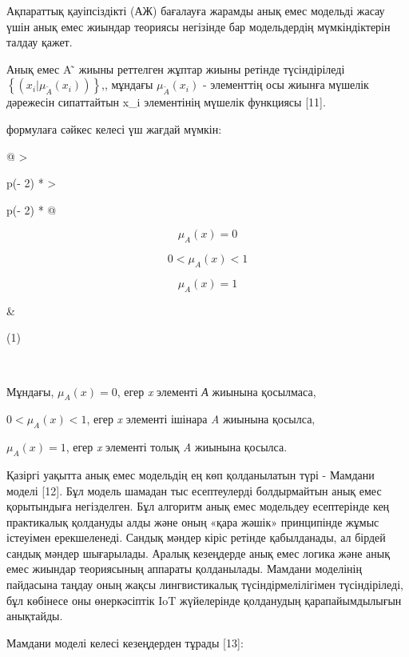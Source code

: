 \documentclass[
]{article}
\begin{document}
Ақпараттық қауіпсіздікті (АЖ) бағалауға жарамды анық емес модельді жасау
үшін анық емес жиындар теориясы негізінде бар модельдердің
мүмкіндіктерін талдау қажет.

Анық емес A ̃ жиыны реттелген жұптар жиыны ретінде түсіндіріледі
\(\left\{ \left( x_{i}|\mu_{\widetilde{A}}(x_{i}) \right) \right\}\),,
мұндағы \(\mu_{\widetilde{A}}(x_{i})\) - элементтің осы жиынға мүшелік
дәрежесін сипаттайтын x\_i элементінің мүшелік функциясы {[}11{]}.

формулаға сәйкес келесі үш жағдай мүмкін:

\begin{longtable}[]{@{}
  >{\raggedright\arraybackslash}p{(\columnwidth - 2\tabcolsep) * }
  >{\raggedright\arraybackslash}p{(\columnwidth - 2\tabcolsep) * }@{}}
\toprule\noalign{}
\begin{minipage}[b]{\linewidth}\raggedright
\[\mu_{A}(x) = 0\]

\[0 < \mu_{A}(x) < 1\]

\[\mu_{A}(x) = 1\]
\end{minipage} & \begin{minipage}[b]{\linewidth}\raggedright
(1)
\end{minipage} \\
\midrule\noalign{}
\endhead
\bottomrule\noalign{}
\endlastfoot
\end{longtable}

Мұндағы, \(\mu_{A}(x) = 0\), егер \emph{x} элементі \emph{А} жиынына
қосылмаса,

\(0 < \mu_{A}(x) < 1\), егер \emph{x} элементі ішінара \emph{A} жиынына
қосылса,

\(\mu_{A}(x) = 1\), егер \emph{x} элементі толық \emph{A} жиынына
қосылса.

Қазіргі уақытта анық емес модельдің ең көп қолданылатын түрі - Мамдани
моделі {[}12{]}. Бұл модель шамадан тыс есептеулерді болдырмайтын анық
емес қорытындыға негізделген. Бұл алгоритм анық емес модельдеу
есептерінде кең практикалық қолдануды алды және оның «қара жәшік»
принципінде жұмыс істеуімен ерекшеленеді. Сандық мәндер кіріс ретінде
қабылданады, ал бірдей сандық мәндер шығарылады. Аралық кезеңдерде анық
емес логика және анық емес жиындар теориясының аппараты қолданылады.
Мамдани моделінің пайдасына таңдау оның жақсы лингвистикалық
түсіндірмелілігімен түсіндіріледі, бұл көбінесе оны өнеркәсіптік IoT
жүйелерінде қолданудың қарапайымдылығын анықтайды.

Мамдани моделі келесі кезеңдерден тұрады {[}13{]}:
\end{document}
